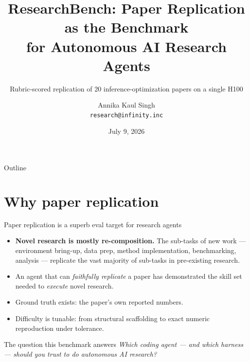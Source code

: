 \documentclass[aspectratio=169]{beamer}
\title{ResearchBench: Paper Replication as the Benchmark\\for Autonomous AI Research Agents}
\subtitle{Rubric-scored replication of 20 inference-optimization papers on a single H100}
\author{Annika Kaul Singh \\ \texttt{research@infinity.inc}}
\date{July 9, 2026}
\begin{document}
\begin{frame}
  \titlepage
\end{frame}

\begin{frame}{Outline}
  \tableofcontents[hideallsubsections]
\end{frame}

\section{Why paper replication}

\begin{frame}{Paper replication is a superb eval target for research agents}
  \begin{itemize}
    \item \textbf{Novel research is mostly re-composition.} The sub-tasks of new work
          --- environment bring-up, data prep, method implementation, benchmarking,
          analysis --- replicate the vast majority of sub-tasks in pre-existing research.
    \item An agent that can \emph{faithfully replicate} a paper has demonstrated the
          skill set needed to \emph{execute} novel research.
    \item Ground truth exists: the paper's own reported numbers.
    \item Difficulty is tunable: from structural scaffolding to exact numeric
          reproduction under tolerance.
  \end{itemize}
  \vfill
  \begin{block}{The question this benchmark answers}
    \emph{Which coding agent --- and which harness --- should you trust to do
    autonomous AI research?}
  \end{block}
\end{frame}
\end{document}
